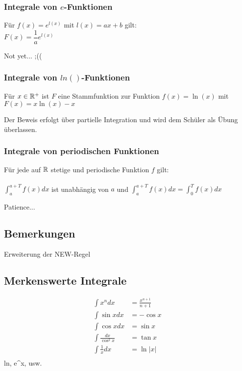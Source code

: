 \subsubsection{Integrale von $e$-Funktionen}
\begin{Theorem}
  Für $f(x)=e^{l(x)}$ mit $l(x) = ax+b$ gilt:\\
  $F(x) = \dfrac{1}{a}e^{l(x)}$
\end{Theorem}
\begin{Beweis}
  Not yet... ;((
\end{Beweis}
\subsubsection{Integrale von $ln()$-Funktionen}
\begin{Theorem}
  Für $x \in \mathbb{R}^{+}$ ist $F$ eine Stammfunktion zur Funktion $f(x) = \ln(x)$ mit $F(x) = x \ln(x)-x$
\end{Theorem}
\begin{Beweis}
  Der Beweis erfolgt über partielle Integration und wird dem Schüler als Übung überlassen.
\end{Beweis}
\subsubsection{Integrale von periodischen Funktionen}
\begin{Theorem}
  Für jede auf $\mathbb{R}$ stetige und periodische Funktion $f$ gilt:\\\\
  $\int_a^{a+T} f(x)dx$ ist unabhängig von $a$ und $\int_a^{a+T} f(x)dx = \int_0^{T} f(x)dx$
\end{Theorem}
\begin{Beweis}
  Patience...
\end{Beweis}
\subsection{Bemerkungen}
Erweiterung der NEW-Regel\\

\subsection{Merkenswerte Integrale}
\begin{align*}
  \int x^n dx&=\frac{x^{n+1}}{n+1}\\
  \int\sin x dx&= -\cos x\\
  \int\cos x dx&= \sin x\\
  \int\frac{ dx}{\cos^2x}&= \tan x\\
  \int\frac{1}{x} dx&= \ln|x|\\
\end{align*}
ln, e^x, usw.

